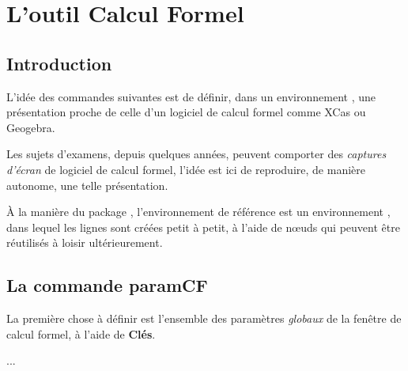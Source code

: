 \documentclass{article}
\newcommand\ctex[1]{\tcbox[vignettelatex]{#1}}
\newcommand\Cle[1]{{\bfseries\sffamily\textlangle #1\textrangle}}
\begin{document}
\newpage

\section{L'outil \og Calcul Formel \fg}

\subsection{Introduction}

\begin{codeidee}
L'idée des commandes suivantes est de définir, dans un environnement \TikZ, une présentation proche de celle d'un logiciel de calcul formel comme \textsf{XCas} ou \textsf{Geogebra}.

\smallskip

Les sujets d'examens, depuis quelques années, peuvent comporter des \textit{captures d'écran} de logiciel de calcul formel, l'idée est ici de reproduire, de manière autonome, une telle présentation.

\smallskip

À la manière du {package} \ctex{tkz-tab}, l'environnement de référence est un environnement \TikZ, dans lequel les lignes sont créées petit à petit, à l'aide de nœuds qui peuvent être réutilisés à loisir ultérieurement.
\end{codeidee}

\subsection{La commande \og paramCF \fg}

\begin{codeinfo}
La première chose à définir est l'ensemble des paramètres \textit{globaux} de la fenêtre de calcul formel, à l'aide de \Cle{Clés}.
\end{codeinfo}

\smallskip

\begin{codetex}
...
\end{codetex}

\smallskip
\end{document}
